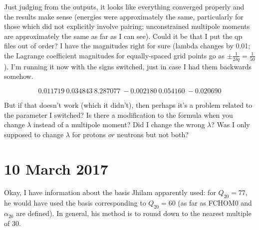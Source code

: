 \documentclass[]{report}
\begin{document}
Just judging from the outputs, it looks like everything converged properly and the results make sense (energies were approximately the same, particularly for those which did not explicitly involve pairing; unconstrained multipole moments are approximately the same as far as I can see). Could it be that I put the qp files out of order? I have the magnitudes right for sure (lambda changes by 0.01; the Lagrange coefficient magnitudes for equally-spaced grid points go as $\pm\frac{1}{2\delta q} = \frac{1}{50}$). I'm running it now with the signs switched, just in case I had them backwards somehow. 

\begin{equation}
    0.011719\    0.034843\    8.287077\   -0.002180\    0.054160\   -0.020690
\end{equation}

\noindent But if that doesn't work (which it didn't), then perhaps it's a problem related to the parameter I switched? Is there a modification to the formula when you change $\lambda$ instead of a multipole moment? Did I change the wrong $\lambda$? Was I only supposed to change $\lambda$ for protons $\mathit{or}$ neutrons but not both?

\section*{10 March 2017}
Okay, I have information about the basis Jhilam apparently used: for $Q_{20}=77$, he would have used the basis corresponding to $Q_{20}=60$ (as far as FCHOM0 and $\alpha_{20}$ are defined). In general, his method is to round down to the nearest multiple of 30.
\end{document}
